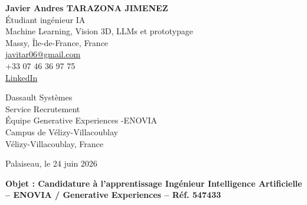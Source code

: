 \documentclass[10pt,a4paper]{article}
\begin{document}
\begin{minipage}[t]{0.48\textwidth}
\textbf{\large Javier Andres TARAZONA JIMENEZ}\\
Étudiant ingénieur IA \\
Machine Learning, Vision 3D, LLMs et prototypage \\
Massy, Île-de-France, France\\
\href{mailto:javitar06@gmail.com}{javitar06@gmail.com}\\
+33 07 46 36 97 75\\
\href{https://www.linkedin.com/in/javier-andres-tarazona-jimenez-84b489222/}{LinkedIn}
\end{minipage}
\hfill
\begin{minipage}[t]{0.42\textwidth}
\raggedleft
Dassault Systèmes \\
Service Recrutement \\
Équipe Generative Experiences -ENOVIA  \\
Campus de Vélizy-Villacoublay \\
Vélizy-Villacoublay, France \\
\end{minipage}

\vspace{1.1cm}

\raggedleft
Palaiseau, le 24 juin 2026

\vspace{0.7cm}

\raggedright
\textbf{Objet : Candidature à l’apprentissage Ingénieur Intelligence Artificielle – ENOVIA / Generative Experiences – Réf. 547433}

\vspace{0.5cm}
\end{document}
